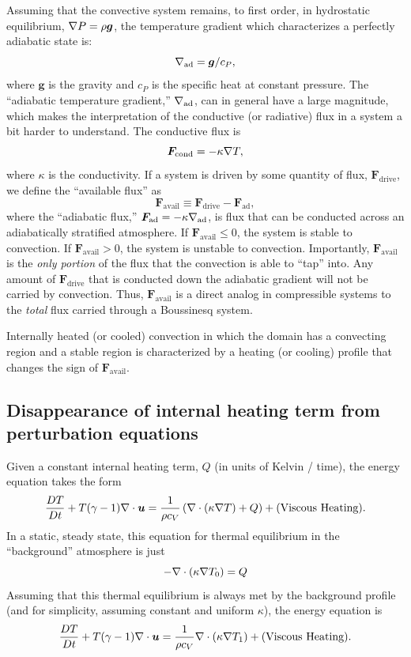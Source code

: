 Assuming that the convective system remains, to first order, in hydrostatic equilibrium, $\nabla P = \rho \bm{g}$, the temperature gradient which characterizes a perfectly adiabatic state is:
\begin{equation}
\nabla_{\text{ad}} = \bm{g}/c_P,
\end{equation}
where $\bm{g}$ is the gravity and $c_P$ is the specific heat at constant pressure.
The ``adiabatic temperature gradient,'' $\nabla_{\text{ad}}$, can in general have a large magnitude, which makes the interpretation of the conductive (or radiative) flux in a system a bit harder to understand.
The conductive flux is
\begin{equation}
\bm{F}_{\text{cond}} = -\kappa \nabla T,
\end{equation}
where $\kappa$ is the conductivity.
If a system is driven by some quantity of flux, $\bm{F}_{\text{drive}}$, we define the ``available flux'' as
\begin{equation}
\bm{F}_{\text{avail}} \equiv \bm{F}_{\text{drive}} - \bm{F}_{\text{ad}},
\end{equation}
where the ``adiabatic flux,'' $\bm{F}_{\text{ad}} = -\kappa\nabla_{\text{ad}}$, is flux that can be conducted across an adiabatically stratified atmosphere.
If $\bm{F}_{\text{avail}} \leq 0$, the system is stable to convection.
If $\bm{F}_{\text{avail}} > 0$, the system is unstable to convection.
Importantly, $\bm{F}_{\text{avail}}$ is the \emph{only portion} of the flux that the convection is able to ``tap'' into.
Any amount of $\bm{F}_{\text{drive}}$ that is conducted down the adiabatic gradient will not be carried by convection.
Thus, $\bm{F}_{\text{avail}}$ is a direct analog in compressible systems to the \emph{total} flux carried through a Boussinesq system.

Internally heated (or cooled) convection in which the domain has a convecting region and a stable region is characterized by a heating (or cooling) profile that changes the sign of $\bm{F}_{\text{avail}}$.

\subsection{Disappearance of internal heating term from perturbation equations}
Given a constant internal heating term, $Q$ (in units of Kelvin / time), the energy equation takes the form
\begin{equation}
\frac{D T}{Dt} + T(\gamma-1)\nabla\cdot\bm{u} = \frac{1}{\rho c_V}\left(\nabla\cdot\left( \kappa \nabla T\right) + Q\right) + \text{(Viscous Heating)}.
\end{equation}
In a static, steady state, this equation for thermal equilibrium in the ``background'' atmosphere is just
\begin{equation}
-\nabla\cdot\left( \kappa \nabla T_0\right) = Q
\end{equation}
Assuming that this thermal equilibrium is always met by the background profile (and for simplicity, assuming constant and uniform $\kappa$), the energy equation is
\begin{equation}
\frac{D T}{Dt} + T(\gamma-1)\nabla\cdot\bm{u} = \frac{1}{\rho c_V}\nabla\cdot\left( \kappa \nabla T_1\right) + \text{(Viscous Heating)}.
\end{equation}


